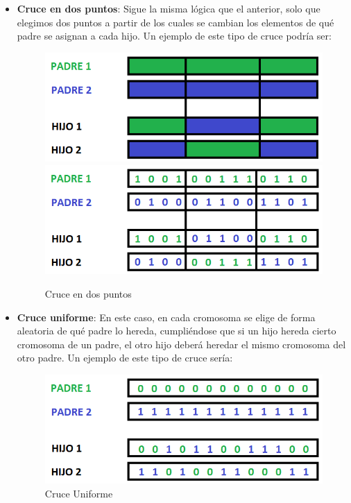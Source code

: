 \begin{itemize}
	\item \textbf{Cruce en dos puntos}: Sigue la misma lógica que el anterior, solo que elegimos dos puntos a partir de los cuales se cambian los elementos de qué padre se asignan a cada hijo. 
Un ejemplo de este tipo de cruce podría ser:
\begin{figure}[h]
		\centering
		\includegraphics[scale=0.5]{imagenes/Crossover2point.png}
		\includegraphics[scale=0.5]{imagenes/Crossover2pointNumber.png}
        \caption{Cruce en dos puntos}
        \label{fig:Crossover2}
\end{figure}
	\item \textbf{Cruce uniforme}: En este caso, en cada cromosoma se elige de forma aleatoria de qué padre lo hereda, cumpliéndose que si un hijo hereda cierto cromosoma de un padre, el otro hijo deberá heredar el mismo cromosoma del otro padre. 
Un ejemplo de este tipo de cruce sería: 
\begin{figure}[h]
		\centering
		\includegraphics[scale=0.5]{imagenes/CrossoverUniformNumber.png}
        \caption{Cruce Uniforme}
        \label{fig:CrossoverUniform}
\end{figure}
\end{itemize}

